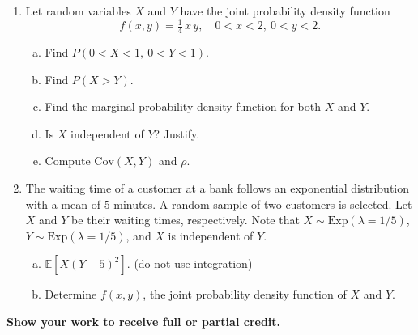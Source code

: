 \documentclass[12pt]{article}
\begin{document}
\begin{enumerate}
    \textbf{PLUS}
    \begin{enumerate}[(b)]
      \item Find $\rho$, the correlation coefficient.
    \end{enumerate}

  \newpage
  \item Let random variables $X$ and $Y$ have the joint probability density function
    \[
      f(x, y) = \tfrac{1}{4}\, x\, y, \quad 0 < x < 2,\ 0 < y < 2.
    \]
    \begin{enumerate}[(a)]
      \item Find $P(0 < X < 1,\ 0 < Y < 1)$.
      \item Find $P(X > Y)$.
      \item Find the marginal probability density function for both $X$ and $Y$.
      \item Is $X$ independent of $Y$? Justify.
      \item Compute $\mathrm{Cov}(X, Y)$ and $\rho$.
    \end{enumerate}

  \newpage
  \item The waiting time of a customer at a bank follows an exponential distribution with a mean of $5$ minutes. A random sample of two customers is selected. Let $X$ and $Y$ be their waiting times, respectively. Note that $X \sim \mathrm{Exp}(\lambda = 1/5)$, $Y \sim \mathrm{Exp}(\lambda = 1/5)$, and $X$ is independent of $Y$.
    \begin{enumerate}[(a)]
      \item $\mathbb{E}\!\left[X(Y - 5)^2\right]$. (do not use integration)
      \item Determine $f(x, y)$, the joint probability density function of $X$ and $Y$.
    \end{enumerate}
\end{enumerate}

\begin{center}
  \textbf{\large Show your work to receive full or partial credit.}
\end{center}
\end{document}
